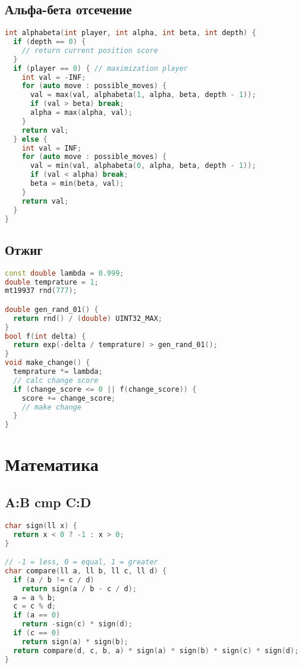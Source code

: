 \documentclass[9pt,a4paper,landscape,twosided]{extarticle}
\begin{document}
\begin{multicols*}{3}
\subsection{Альфа-бета отсечение}
\begin{lstlisting}[language=C++]
int alphabeta(int player, int alpha, int beta, int depth) {
  if (depth == 0) {
    // return current position score
  }
  if (player == 0) { // maximization player
    int val = -INF;
    for (auto move : possible_moves) {
      val = max(val, alphabeta(1, alpha, beta, depth - 1));
      if (val > beta) break;
      alpha = max(alpha, val);
    }
    return val;
  } else {
    int val = INF;
    for (auto move : possible_moves) {
      val = min(val, alphabeta(0, alpha, beta, depth - 1));
      if (val < alpha) break;
      beta = min(beta, val);
    }
    return val;
  }
}
\end{lstlisting}

\subsection{Отжиг}
\begin{lstlisting}[language=C++]
const double lambda = 0.999;
double temprature = 1;
mt19937 rnd(777);

double gen_rand_01() {
  return rnd() / (double) UINT32_MAX;
}
bool f(int delta) {
  return exp(-delta / temprature) > gen_rand_01();
}
void make_change() {
  temprature *= lambda;
  // calc change score
  if (change_score <= 0 || f(change_score)) {
    score += change_score;
    // make change
  }
}
\end{lstlisting}

\section{Математика}

\subsection{A:B cmp C:D}
\begin{lstlisting}[language=C++]
char sign(ll x) {
  return x < 0 ? -1 : x > 0;
}

// -1 = less, 0 = equal, 1 = greater
char compare(ll a, ll b, ll c, ll d) {
  if (a / b != c / d)
    return sign(a / b - c / d);
  a = a % b;
  c = c % d;
  if (a == 0)
    return -sign(c) * sign(d);
  if (c == 0)
    return sign(a) * sign(b);
  return compare(d, c, b, a) * sign(a) * sign(b) * sign(c) * sign(d);
}


\end{lstlisting}
\end{multicols*}
\end{document}
